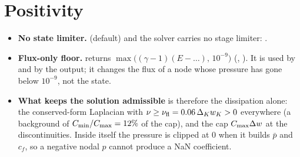 \documentclass[10pt]{article}
\begin{document}
\section{Positivity}
\begin{itemize}[leftmargin=*]
\item \textbf{No state limiter.}  (default) and the solver carries
no stage limiter: .
\item \textbf{Flux-only floor.}  returns $\max\big((\gamma-1)(E-\dots),\,10^{-9}\big)$
(, ). It is used by  and by the
output; it changes the flux of a node whose pressure has gone below $10^{-9}$, not the state.
\item \textbf{What keeps the solution admissible} is therefore the dissipation alone: the conserved-form
Laplacian with $\nu\ge\nu_{\mathrm{fl}}=0.06\,\Delta_Kw_K>0$ everywhere (a background of
$C_{\min}/C_{\max}=12\%$ of the cap), and the cap $C_{\max}\Delta w$ at the discontinuities. Inside \dsgs{} itself the pressure
is clipped at 0 when it builds $\bar p$ and $c_f$, so a negative nodal $p$ cannot produce a NaN coefficient.
\end{itemize}
\end{document}
